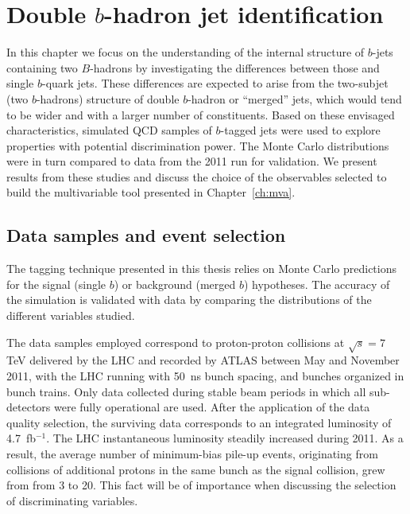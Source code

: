 \chapter{Double $b$-hadron jet identification}\label{ch:kinematic}

In this chapter we focus on the understanding of the internal structure of $b$-jets containing two $B$-hadrons by investigating the differences between those and single $b$-quark jets.  These differences %
are expected to arise from the two-subjet (two $b$-hadrons) structure of double $b$-hadron or ``merged'' jets, which would tend to be wider and with a larger number of constituents. 
Based on these envisaged characteristics, simulated QCD samples of $b$-tagged jets were used to explore properties with potential discrimination power.  The Monte Carlo distributions were in turn compared to data from the 2011 run for validation.
We present results from these studies and discuss the choice of the observables selected to build the multivariable tool presented in Chapter~\ref{ch:mva}.


\section{Data samples and event selection}\label{sec:analysis}


The tagging technique presented in this thesis relies on Monte Carlo predictions for the signal (single $b$) or background (merged $b$) hypotheses. The accuracy of the simulation is validated with data by comparing the distributions of the different variables studied.

The data samples employed correspond to proton-proton collisions at $\sqrt{s}=7$ TeV delivered by the LHC and recorded by ATLAS between May and November 2011, with the LHC running with 50~ns bunch spacing, and bunches organized in bunch trains. Only data collected during stable beam periods in which all sub-detectors were fully operational are used. After the application of the data quality selection, the  surviving data corresponds to an integrated luminosity of 4.7~fb$^{-1}$. The LHC instantaneous luminosity steadily increased during 2011. As a result, the average number of minimum-bias pile-up events, originating from collisions of additional protons in the same bunch as the signal collision, grew from from 3 to 20. This fact will be of importance when discussing the selection of discriminating variables.  


